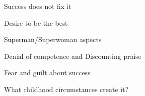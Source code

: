 \documentclass[aspectratio=169]{beamer}
\begin{document}
\begin{frame}
  \begin{center}
    \Huge Success does not fix it
    \\ \small \cite{clanceimes78}
  \end{center}
\end{frame}

\begin{frame}
  \begin{center}
    \Huge Desire to be the best
    \\ \small \cite{sakulku11}
  \end{center}
\end{frame}

\begin{frame}
  \begin{center}
    \Huge Superman/Superwoman aspects
    \\ \small \cite{sakulku11}
  \end{center}
\end{frame}

\begin{frame}
  \begin{center}
    \Huge Denial of competence and Discounting praise
    \\ \small \cite{sakulku11}
  \end{center}
\end{frame}

\begin{frame}
  \begin{center}
    \Huge Fear and guilt about success
    \\ \small \cite{sakulku11}
  \end{center}
\end{frame}


\begin{frame}
  \begin{center}
    \Huge What childhood circumstances create it?

    \small \cite{sakulku11}
  \end{center}
\end{frame}
\end{document}
